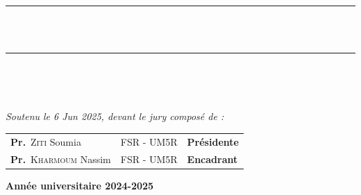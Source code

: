 \begin{titlepage}
\begin{center}
    \rule{\linewidth}{0.3mm} \\[0.4cm]
    { \huge \bfseries\color{blue} \mytitle \\[0.4cm] }
    \rule{\linewidth}{0.3mm} \\[1cm]
    
    \begin{center}
    \begin{minipage}{\linewidth}
    \begin{flushright}
   
    \end{flushright}   
    \end{minipage}\\[2cm]
    \end{center} 
    {\large \textit{Soutenu le 6 Jun 2025, devant le jury composé de : }}\\[0.5cm]
    \color{black}
    \begin{tabular}{>{\arraybackslash}m{6cm} >{\arraybackslash}m{5cm} >{\arraybackslash}m{6cm}}
        \large \textbf{Pr.}~\textsc{Ziti} Soumia     & FSR - UM5R & \large \textbf{Présidente} \\[0.1cm]
        \large \textbf{Pr.}~\textsc{Kharmoum} Nassim & FSR - UM5R      & \large \textbf{Encadrant} \\[0.1cm]        
    \end{tabular}
    
    \vfill
    {\textbf{\large {Année universitaire} 2024-2025}}
    \end{center}
    \end{titlepage}